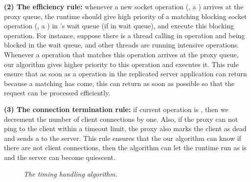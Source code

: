 \textbf{(2) The efficiency rule:} whenever a new socket operation (\eg, a \send)
arrives at the proxy queue, the \parrot runtime should give high priority of a
matching blocking socket operation (\eg, a \recv) in \parrot's wait queue (if in
wait queue), and execute this blocking operation. For instance, suppose there is
a thread calling in \recv operation and being blocked in the \parrot wait queue,
and other threads are running intensive \mutexlock operations. Whenever a \send
operation that matches this \recv operation arrives at the proxy queue, our
algorithm gives higher priority to this \recv operation and executes it. This
rule ensure that as soon as a \recv operation in the replicated server
application can return because a matching \send has come, this \recv can return
as soon as possible so that the request can be processed efficiently.

\textbf{(3) The connection termination rule:} if current \paxos operation is
\close, then we decrement the number of client connections by one. Also, if the
proxy can not ping to the client within a timeout limit, the proxy also marks
the client as dead and sends a \close to the server. This rule ensures that the
our algorithm can know if there are not client connections, then the algorithm
can let the \parrot runtime run as is and the server can become quiescent.

\begin{figure}[!ht]
\hspace{0.3in}
\begin{minipage}{.5\textwidth}
\tiny {}
\end{minipage}
\vspace{-.1in}
\caption{{\em The timing handling algorithm.}} \label{fig:msmr-wait-rule}
\vspace{-.05in}
\end{figure}



